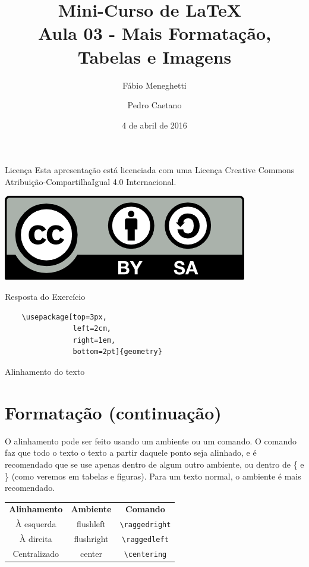 \documentclass[12pt]{beamer}
\title{Mini-Curso de \LaTeX\ \\ Aula 03 - Mais Formatação, Tabelas e Imagens}
\author{Fábio Meneghetti \and Pedro Caetano}
\date{4 de abril de 2016}
\begin{document}
\begin{frame}
  \titlepage
\end{frame}

\begin{frame}{Licença}
  Esta apresentação está licenciada com uma Licença Creative Commons Atribuição-CompartilhaIgual 4.0 Internacional.
  \begin{center}
    \includegraphics[scale=0.3]{../license.png}
  \end{center}
\end{frame}

\begin{frame}[fragile]{Resposta do Exercício}

  \begin{verbatim}
    \usepackage[top=3px,
                left=2cm,
                right=1em,
                bottom=2pt]{geometry}
  \end{verbatim}

\end{frame}

\begin{frame}
  \tableofcontents
\end{frame}

\begin{frame}[fragile]{Alinhamento do texto}
  \section{Formatação (continuação)}
  O alinhamento pode ser feito usando um ambiente ou um comando. O comando faz que todo o texto o texto a partir daquele ponto seja alinhado, e é recomendado que se use apenas dentro de algum outro ambiente, ou dentro de \{ e \} (como veremos em tabelas e figuras). Para um texto normal, o ambiente é mais recomendado.
  \begin{center}
    \begin{tabular}{ccc}
    \textbf{Alinhamento} & \textbf{Ambiente} & \textbf{Comando}\\
    À esquerda & flushleft & \verb+\raggedright+\\
    À direita & flushright & \verb+\raggedleft+\\
    Centralizado & center & \verb+\centering+\\
    \end{tabular}
  \end{center}
\end{frame}
\end{document}

